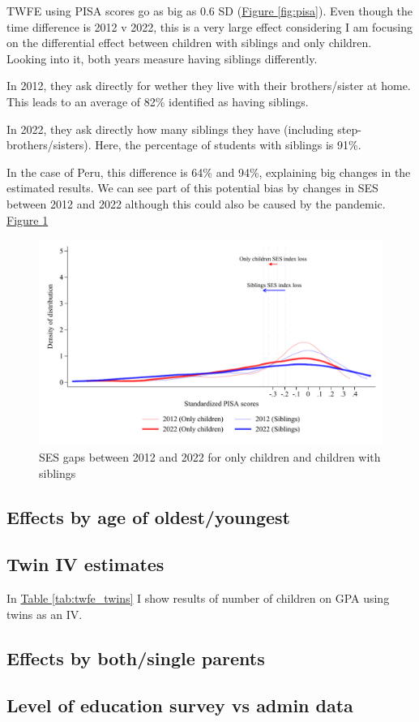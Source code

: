 TWFE using PISA scores go as big as 0.6 SD (\hyperref[fig:pisa]{Figure \ref{fig:pisa}}). Even though the time difference is 2012 v 2022, this is a very large effect considering I am focusing on the differential effect between children with siblings and only children. Looking into it, both years measure having siblings differently.

In 2012, they ask directly for wether they live with their brothers/sister at home. This leads to an average of 82\% identified as having siblings.

In 2022, they ask directly how many siblings they have (including step-brothers/sisters). Here, the percentage of students with siblings is 91\%.

In the case of Peru, this difference is 64\% and 94\%, explaining big changes in the estimated results. We can see part of this potential bias by changes in SES between 2012 and 2022 although this could also be caused by the pandemic. \hyperref[fig:pisa_ses]{Figure \ref{fig:pisa_ses}}




\begin{figure}[htbp]
    \centering
\includegraphics[width=\textwidth]{./FIGURES/Descriptive/PISA_distribution_2012_2022_ses.pdf}
        \caption{SES gaps between 2012 and 2022 for only children and children with siblings}
        \label{fig:pisa_ses}

\end{figure}


\subsection{Effects by age of oldest/youngest}

\subsection{Twin IV estimates}

In \hyperref[tab:twfe_twins]{Table \ref{tab:twfe_twins}} I show results of number of children on GPA using twins as an IV.





\subsection{Effects by both/single parents}

\subsection{Level of education survey vs admin data}



\newpage

